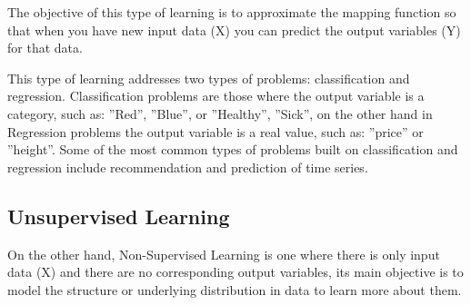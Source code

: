 The objective of this type of learning is to approximate the mapping function so that when you have new input data (X) you can predict the output variables (Y) for that data.

\vspace{5mm} %

This type of learning addresses two types of problems: classification and regression. Classification problems are those where the output variable is a category, such as: ''Red'', ''Blue'', or ''Healthy'', ''Sick'', on the other hand in Regression problems the output variable is a real value, such as: ''price'' or ''height''. Some of the most common types of problems built on classification and regression include recommendation and prediction of time series.

\subsection{Unsupervised Learning}

On the other hand, Non-Supervised Learning is one where there is only input data (X) and there are no corresponding output variables, its main objective is to model the structure or underlying distribution in  data to learn more about them.

\vspace{5mm} %

